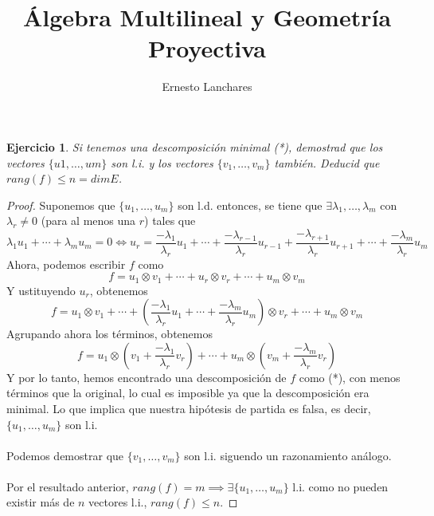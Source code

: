 \documentclass[12pt]{article}
\theoremstyle{break}
\newtheorem{ej}{Ejercicio}
\newtheorem*{proof}{Demostración}
\begin{document}
\date{}

\title{Álgebra Multilineal y Geometría Proyectiva}
\author{Ernesto Lanchares}
\maketitle

\begin{ej}
Si tenemos una descomposición minimal (*), demostrad que los vectores $\{u1,\dots, um\}$ son
l.i. y los vectores $\{v_1,\dots, v_m\}$ también. Deducid que $rang(f) \leq n = dimE$.
\end{ej}
\begin{proof}
Suponemos que $\{u_1,\dots, u_m\}$ son l.d. entonces, se tiene que 
$\exists \lambda_1,\dots,\lambda_m$ con $\lambda_r \neq 0$ (para al menos una $r$) tales que
\[
    \lambda_1 u_1 + \cdots + \lambda_m u_m = 0 \iff
    u_r = \frac{-\lambda_1}{\lambda_r} u_1+\cdots + \frac{-\lambda_{r-1}}{\lambda_r} u_{r-1}+
    \frac{-\lambda_{r+1}}{\lambda_r} u_{r+1} + \cdots  + \frac{-\lambda_m}{\lambda_r} u_m
\]
Ahora, podemos escribir $f$ como
\[
	f = u_1 \otimes v_1 + \cdots + u_r \otimes v_r + \cdots + u_m \otimes v_m
\]
Y ustituyendo $u_r$, obtenemos
\[
	f = u_1 \otimes v_1 + \cdots + \left( \frac{-\lambda_1}{\lambda_r} u_1 + \cdots +
	\frac{-\lambda_m}{\lambda_r} u_m \right) \otimes v_r + \cdots + u_m \otimes v_m
\]
Agrupando ahora los términos, obtenemos
\[
	f = u_1 \otimes \left( v_1 + \frac{-\lambda_1}{\lambda_r} v_r \right) + \cdots +
	u_m \otimes \left( v_m + \frac{-\lambda_m}{\lambda_r} v_r \right)
\]
Y por lo tanto, hemos encontrado una descomposición de $f$ como (*), con menos términos que
la original, lo cual es imposible ya que la descomposición era minimal. Lo que implica que
nuestra hipótesis de partida es falsa, es decir, $\{u_1,\dots,u_m\}$ son l.i.
\\ \\
Podemos demostrar que $\{v_1,\dots, v_m \}$ son l.i. siguendo un razonamiento análogo.
\\ \\
Por el resultado anterior, $rang(f) = m \implies \exists \{u_1,\dots,u_m\}$ l.i. como no
pueden existir más de $n$ vectores l.i., $rang(f) \leq n$.
\end{proof}
\end{document}
